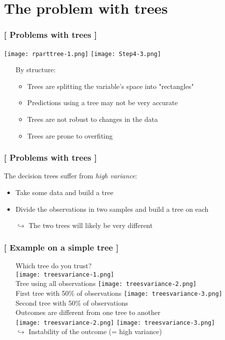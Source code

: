 \documentclass[xcolor=x11names,compress, aspectratio=169]{beamer}
\renewcommand{\(}{\begin{columns}}
\renewcommand{\)}{\end{columns}}
\newcommand{\<}[1]{\begin{column}{#1}}
\renewcommand{\>}{\end{column}}
\begin{document}
\section{The problem with trees}

\begin{frame} %
\frametitle{\textcolor{brique}{[ Problems with  trees ]}}
 \texttt{[image: rparttree-1.png]} \texttt{[image: Step4-3.png]}
\pause
\begin{itemize}
  \item[] By structure:
  \begin{itemize}[<+->]
    \item Trees are splitting the variable's space into "rectangles"
    \item Predictions using a tree may not be  very accurate
    \item Trees are not robust to changes in the data
    \item  Trees are prone to overfiting
  \end{itemize}
\end{itemize}
\end{frame}


\begin{frame}
\frametitle{\textcolor{brique}{[ Problems with  trees  ]}}
The decision trees  suffer from \textit{high variance}:
\pause
\begin{itemize}[<+->]
    \item Take some data and build a tree
    \item Divide the observations in two samples and build a tree on each
    \item[$\hookrightarrow$] The two trees will likely be very different
\end{itemize}
\end{frame}

\begin{frame} %
\frametitle{\textcolor{brique}{[ Example on a simple tree ]}}
\pause
\begin{itemize}
\item[] Which tree do you trust? \\
    {\texttt{[image: treesvariance-1.png]} \\ }
    {Tree using all observations}
    {\texttt{[image: treesvariance-2.png]} \\ }
    {First tree with 50\% of observations}
    {\texttt{[image: treesvariance-3.png]} \\ }
    {Second tree with 50\% of observations}
    { $\;$ \\}
    {Outcomes are different from one tree to another\\ }
    {\texttt{[image: treesvariance-2.png]} \texttt{[image: treesvariance-3.png]} \\ }
    {$\hookrightarrow$ Instability of the outcome (= high variance)}
\end{itemize}
\end{frame}
\end{document}
